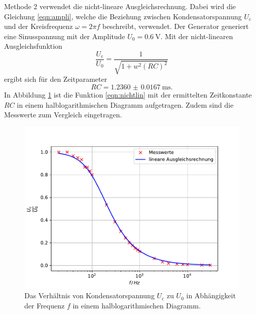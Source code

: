 Methode 2 verwendet die nicht-lineare Ausgleichsrechnung.
Dabei wird die Gleichung \ref{eqn:ampli}, welche die Beziehung zwischen Kondensatorspannung $U_\text{c}$ und der Kreisfrequenz $\omega = 2 \pi f$ beschreibt, verwendet.
Der Generator generiert eine Sinusspannung mit der Amplitude $U_0 = \SI{0.6}{\volt}$.
Mit der nicht-linearen Ausgleichsfunktion
\begin{equation}
    \frac{U_\text{c}}{U_0} = \frac{1}{\sqrt{1+w^2(RC)^2}}
    \label{eqn:nichtlin}
\end{equation}
ergibt sich für den Zeitparameter
\begin{equation*}
    RC = \SI{1.2360(167)}{\milli\second} .
\end{equation*}
In Abbildung \ref{fig:spannung} ist die Funktion \ref{eqn:nichtlin} mit der ermittelten Zeitkonstante $RC$ in einem halblogarithmischen Diagramm aufgetragen.
Zudem sind die Messwerte zum Vergleich eingetragen.
\begin{figure}
    \centering
    \includegraphics[width=\textwidth]{content/data/plotb.pdf}
    \caption{Das Verhältnis von Kondensatorspannung $U_\text{c}$ zu $U_0$ in Abhängigkeit der Frequenz $f$ in einem halblogarithmischen Diagramm.}
    \label{fig:spannung}
\end{figure}
\FloatBarrier

